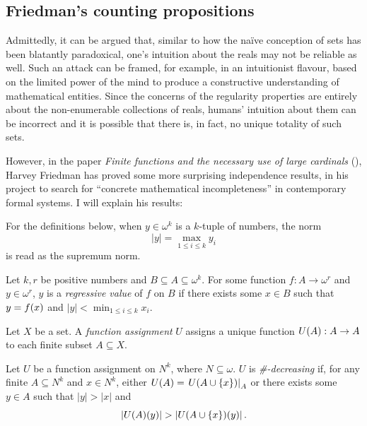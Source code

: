 \documentclass[12pt]{article}
\theoremstyle{plain}
\theoremstyle{definition}
\begin{document}
\subsection{Friedman's counting propositions}

Admittedly, it can be argued that, similar to how the na\"ive conception of sets has been blatantly paradoxical, one's intuition about the reals may not be reliable as well. Such an attack can be framed, for example, in an intuitionist flavour, based on the limited power of the mind to produce a constructive understanding of mathematical entities. Since the concerns of the regularity properties are entirely about the non-enumerable collections of reals, humans' intuition about them can be incorrect and it is possible that there is, in fact, no unique totality of such sets.

However, in the paper \emph{Finite functions and the necessary use of large cardinals} (\cite{friedman-finite-independence}), Harvey Friedman has proved some more surprising independence results, in his project to search for ``concrete mathematical incompleteness'' in contemporary formal systems. I will explain his results:

For the definitions below, when $y \in \omega^k$ is a $k$-tuple of numbers, the norm
\[\left|y\right| = \max_{1 \leq i \leq k} y_i\]
is read as the supremum norm.

\begin{definition}
	Let $k, r$ be positive numbers and $B \subseteq A \subseteq \omega^k$. For some function $f : A \rightarrow \omega^r$ and $y \in \omega^r$, $y$ is a \emph{regressive value} of $f$ on $B$ if there exists some $x \in B$ such that $y = f\mleft(x\mright)$ and $\left|y\right| < \min_{1 \leq i \leq k} x_i$.
\end{definition}

\begin{definition}
	Let $X$ be a set. A \emph{function assignment} $U$ assigns a unique function $U\mleft(A\mright) : A \rightarrow A$ to each finite subset $A \subseteq X$.

	Let $U$ be a function assignment on $N^k$, where $N \subseteq \omega$. $U$ is \emph{\#-decreasing} if, for any finite $A \subseteq N^k$ and $x \in N^k$, either $U\mleft(A\mright) = \left.U\mleft(A \cup \left\{x\right\}\mright)\right|_A$ or there exists some $y \in A$ such that $\left|y\right| > \left|x\right|$ and
	\[\left|U\mleft(A\mright)\mleft(y\mright)\right| > \left|U\mleft(A \cup \left\{x\right\}\mright)\mleft(y\mright)\right|.\]
\end{definition}
\end{document}
